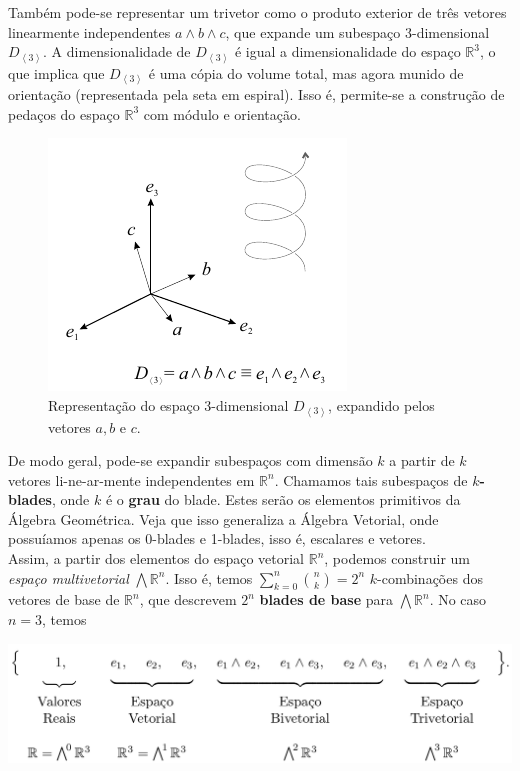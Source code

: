 \documentclass[11pt]{article}
\begin{document}
Também pode-se representar um trivetor como o produto exterior de três vetores linearmente independentes $a\wedge b\wedge c$, que expande um subespaço 3-dimensional $D_{\left < 3 \right >}$. A dimensionalidade de $D_{\left < 3 \right >}$ é igual a dimensionalidade do espaço $\mathbb{R}^3$, o que implica que $D_{\left < 3 \right >}$ é uma cópia do volume total, mas agora munido de orientação (representada pela seta em espiral). Isso é, permite-se a construção de pedaços do espaço $\mathbb{R}^3$ com módulo e orientação.

\begin{figure}[H]
	\begin{center}
		\includegraphics[width=0.3\linewidth]{figures/3blade.png}
	\end{center}
	\caption{Representação do espaço 3-dimensional $D_{\left < 3 \right >}$, expandido pelos vetores $a, b $ e $c$.}
	\label{fig:3blade}
\end{figure}

De modo geral, pode-se expandir subespaços com dimensão $k$ a partir de $k$ vetores li-ne-ar-mente independentes em $\mathbb{R}^n$. Chamamos tais subespaços de \textbf{$k$-blades}, onde $k$ é o \textbf{grau} do blade. Estes serão os elementos primitivos da Álgebra Geométrica. Veja que isso generaliza a Álgebra Vetorial, onde possuíamos apenas os 0-blades e 1-blades, isso é, escalares e vetores. 
\\

Assim, a partir dos elementos do espaço vetorial $\mathbb{R}^n$, podemos construir um \textit{espaço multivetorial} $\bigwedge\mathbb{R}^n$. Isso é, temos $\sum_{k=0}^{n} {n\choose k} = 2^n$ $k$-combinações dos vetores de base de $\mathbb{R}^n$, que descrevem $2^n$ \textbf{blades de base} para $\bigwedge\mathbb{R}^n$. No caso $n =3$, temos

\begin{center}
	\includegraphics[width=0.75\linewidth]{figures/wr3.png}
\end{center}
\end{document}
